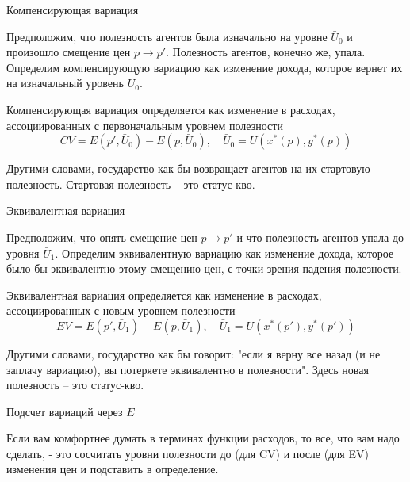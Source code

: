 \documentclass{beamer}
\begin{document}
\begin{frame}{Компенсирующая вариация}

Предположим, что полезность агентов была изначально на уровне $\bar U_0$ и произошло смещение цен $p \to p'$. Полезность агентов, конечно же, упала. Определим компенсирующую вариацию как изменение дохода, которое вернет их на изначальный уровень $\bar U_0$.

\begin{definition} Компенсирующая вариация определяется как изменение в расходах, ассоциированных с первоначальным уровнем полезности
$$CV = E(p',\bar U_0) - E(p,\bar U_0), \quad \bar U_0 = U(x^{\ast}(p), y^{\ast}(p))$$

\end{definition}

Другими словами, государство как бы возвращает агентов на их стартовую полезность. Стартовая полезность – это статус-кво.

\end{frame}

\begin{frame}{Эквивалентная вариация}

Предположим, что опять смещение цен $p \to p'$ и что полезность агентов упала до уровня $\bar U_1$. Определим эквивалентную вариацию как изменение дохода, которое было бы эквивалентно этому смещению цен, с точки зрения падения полезности.

\begin{definition}

Эквивалентная вариация определяется как изменение в расходах, ассоциированных с новым уровнем полезности
$$EV = E(p',\bar U_1) - E(p,\bar U_1), \quad \bar U_1 = U(x^{\ast}(p'), y^{\ast}(p'))$$
\end{definition}

Другими словами, государство как бы говорит: "если я верну все назад (и не заплачу вариацию), вы потеряете эквивалентно в полезности". Здесь новая полезность – это статус-кво.

\end{frame}

\begin{frame}{Подсчет вариаций через $E$}

Если вам комфортнее думать в терминах функции расходов, то все, что вам надо сделать, - это сосчитать уровни полезности до (для CV) и после (для EV) изменения цен и подставить в определение.

\end{frame}
\end{document}
